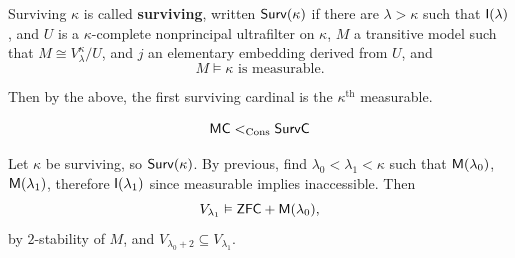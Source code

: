 \documentclass{article}
\begin{document}
\begin{fancydefine}{Surviving}
    $\kappa$ is called \textbf{surviving}, written $\mathsf{Surv}(\kappa)$ if there are $\lambda > \kappa$ such that $\mathsf{I}(\lambda)$, and $U$ is a $\kappa$-complete nonprincipal ultrafilter on $\kappa$, $M$ a transitive model such that $M \cong V_{\lambda}^{\kappa}/U$, and $j$ an elementary embedding derived from $U$, and \[ M \models \kappa \text{ is measurable}.\]
\end{fancydefine}
Then by the above, the first surviving cardinal is the $\kappa^{\text{th}}$ measurable.
\begin{corr}{}\hspace{0.1cm} 
    \[ \mathsf{MC} <_{\operatorname{Cons}} \mathsf{SurvC}\]
\end{corr}
\proof Let $\kappa$ be surviving, so $\mathsf{Surv}(\kappa)$. By previous, find $\lambda_{0} < \lambda_{1} < \kappa$ such that $\mathsf{M}(\lambda_{0})$, $\mathsf{M}(\lambda_{1})$, therefore $\mathsf{I}(\lambda_{1})$ since measurable implies inaccessible. Then \[ V_{\lambda_{1}} \vDash \mathsf{ZFC} + \mathsf{M}(\lambda_{0}),\]
by $2$-stability of $M$, and $V_{\lambda_{0}+2} \subseteq V_{\lambda_{1}}$. \endproof 
\end{document}
